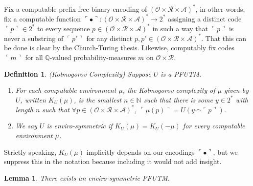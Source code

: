 \documentclass{article}
\newtheorem{definition}[theorem]{Definition}
\newtheorem{lemma}[theorem]{Lemma}
\begin{document}
Fix a computable prefix-free binary encoding of
$(\mathcal O\times \mathcal R\times\mathcal A)^*$, in other words,
fix a computable function
$\ulcorner\bullet\urcorner:(\mathcal O\times \mathcal R\times\mathcal A)^*\to 2^*$
assigning a distinct code $\ulcorner p\urcorner\in 2^*$ to every sequence
$p\in (\mathcal O\times \mathcal R\times\mathcal A)^*$ in such a way that
$\ulcorner p\urcorner$ is never a substring of $\ulcorner p'\urcorner$
for any distinct $p,p'\in (\mathcal O\times \mathcal R\times\mathcal A)^*$.
That this can be done is clear by the Church-Turing thesis.
Likewise, computably fix codes $\ulcorner m\urcorner$ for all
$\mathbb Q$-valued probability-measures $m$ on $\mathcal O\times\mathcal R$.

\begin{definition}
(Kolmogorov Complexity)
Suppose $U$ is a PFUTM.
\begin{enumerate}
    \item
    For each computable environment $\mu$, the \emph{Kolmogorov complexity of $\mu$
    given by $U$}, written $K_U(\mu)$, is the smallest $n\in\mathbb N$ such that
    there is some $y\in 2^*$ with length $n$ such that
    $\forall p\in (\mathcal O\times \mathcal R\times\mathcal A)^*$,
    $\ulcorner\mu(p)\urcorner=U(y\frown\ulcorner p\urcorner)$.
    \item
    We say $U$ is \emph{enviro-symmetric} if
    $K_U(\mu)=K_U(-\mu)$ for every computable environment $\mu$.
\end{enumerate}
\end{definition}

Strictly speaking, $K_U(\mu)$ implicitly depends on our encodings
$\ulcorner \bullet\urcorner$, but we suppress this in the notation because
including it would not add insight.

\begin{lemma}
\label{envirosymmetricexistencelemma}
    There exists an enviro-symmetric PFUTM.
\end{lemma}
\end{document}
